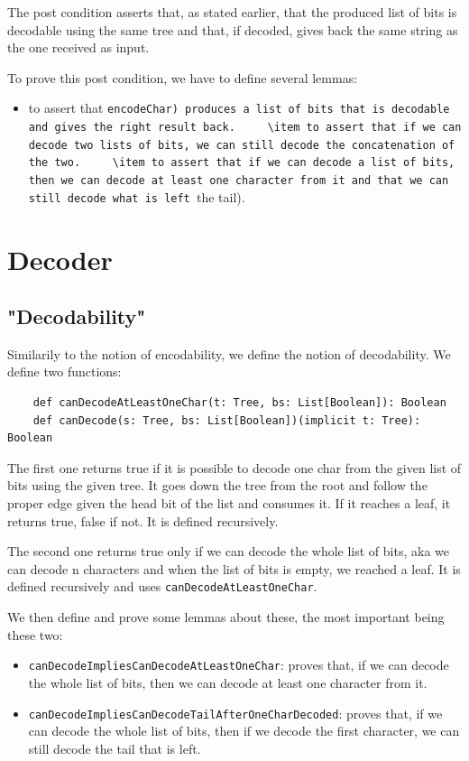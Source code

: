 \documentclass[a4paper,UKenglish,cleveref, autoref, thm-restate]{lipics-v2021}
\begin{document}
The post condition asserts that, as stated earlier, that the produced list of bits is decodable using the same tree and that, if decoded, gives back the same string as the one received as input.

To prove this post condition, we have to define several lemmas:
\begin{itemize}
    \item to assert that \lstinline(encodeChar) produces a list of bits that is decodable and gives the right result back.
    \item to assert that if we can decode two lists of bits, we can still decode the concatenation of the two.
    \item to assert that if we can decode a list of bits, then we can decode at least one character from it and that we can still decode what is left (the tail).
\end{itemize}


\section{Decoder}

\subsection{"Decodability"}
Similarily to the notion of encodability, we define the notion of decodability. We define two functions:
\begin{lstlisting}
    def canDecodeAtLeastOneChar(t: Tree, bs: List[Boolean]): Boolean
    def canDecode(s: Tree, bs: List[Boolean])(implicit t: Tree): Boolean
\end{lstlisting}

The first one returns true if it is possible to decode one char from the given list of bits using the given tree. 
It goes down the tree from the root and follow the proper edge given the head bit of the list and consumes it. If it reaches a leaf, it returns true, false if not. It is defined recursively.

The second one returns true only if we can decode the whole list of bits, aka we can decode n characters and when the list of bits is empty, we reached a leaf. It is defined recursively and uses \lstinline{canDecodeAtLeastOneChar}.

We then define and prove some lemmas about these, the most important being these two:
\begin{itemize}
    \item \lstinline{canDecodeImpliesCanDecodeAtLeastOneChar}: proves that, if we can decode the whole list of bits, then we can decode at least one character from it.
    \item \lstinline{canDecodeImpliesCanDecodeTailAfterOneCharDecoded}: proves that, if we can decode the whole list of bits, then if we decode the first character, we can still decode the tail that is left.
\end{itemize}
\end{document}

